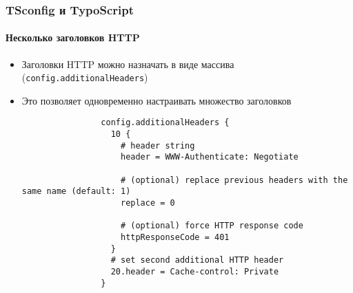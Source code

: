 
\begin{frame}[fragile]
	\frametitle{TSconfig и TypoScript}
	\framesubtitle{Несколько заголовков HTTP}

	\begin{itemize}

		\item Заголовки HTTP можно назначать в виде массива (\small\texttt{config.additionalHeaders}\normalsize)
		\item Это позволяет одновременно настраивать множество заголовков

			\begin{lstlisting}
				config.additionalHeaders {
				  10 {
				    # header string
				    header = WWW-Authenticate: Negotiate

				    # (optional) replace previous headers with the same name (default: 1)
				    replace = 0

				    # (optional) force HTTP response code
				    httpResponseCode = 401
				  }
				  # set second additional HTTP header
				  20.header = Cache-control: Private
				}
			\end{lstlisting}

	\end{itemize}

\end{frame}


